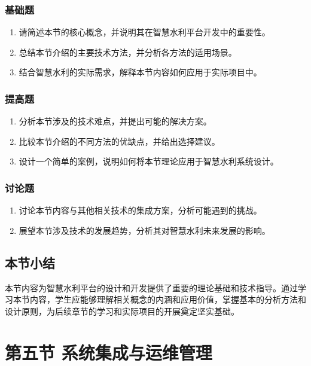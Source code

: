 \subsubsection{基础题}\label{ux57faux7840ux9898-2} \begin{enumerate} \def\labelenumi{\arabic{enumi}.} \tightlist \item
请简述本节的核心概念，并说明其在智慧水利平台开发中的重要性。 \item 总结本节介绍的主要技术方法，并分析各方法的适用场景。 \item 结合智慧水利的实际需求，解释本节内容如何应用于实际项目中。 \end{enumerate}
\subsubsection{提高题}\label{ux63d0ux9ad8ux9898-2} \begin{enumerate} \def\labelenumi{\arabic{enumi}.} \tightlist \item
分析本节涉及的技术难点，并提出可能的解决方案。 \item 比较本节介绍的不同方法的优缺点，并给出选择建议。 \item 设计一个简单的案例，说明如何将本节理论应用于智慧水利系统设计。 \end{enumerate}
\subsubsection{讨论题}\label{ux8ba8ux8bbaux9898-2} \begin{enumerate} \def\labelenumi{\arabic{enumi}.} \tightlist \item
讨论本节内容与其他相关技术的集成方案，分析可能遇到的挑战。 \item 展望本节涉及技术的发展趋势，分析其对智慧水利未来发展的影响。 \end{enumerate}
\subsection{本节小结}\label{ux672cux8282ux5c0fux7ed3-2}
本节内容为智慧水利平台的设计和开发提供了重要的理论基础和技术指导。通过学习本节内容，学生应能够理解相关概念的内涵和应用价值，掌握基本的分析方法和设计原则，为后续章节的学习和实际项目的开展奠定坚实基础。 \section{第五节
系统集成与运维管理}\label{ux7b2cux4e94ux8282-ux7cfbux7edfux96c6ux6210ux4e0eux8fd0ux7ef4ux7ba1ux7406}
